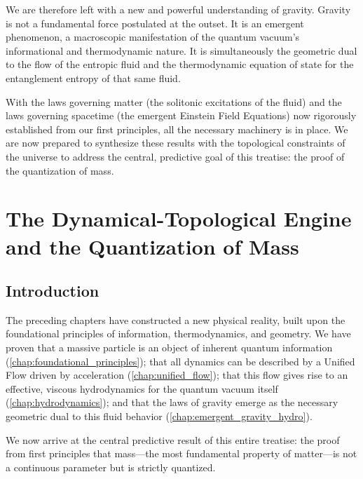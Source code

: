 \documentclass[11pt, letterpaper]{report}
\theoremstyle{plain} %
\theoremstyle{definition} %
\theoremstyle{remark} %
\begin{document}
We are therefore left with a new and powerful understanding of gravity. Gravity is not a fundamental force postulated at the outset. It is an emergent phenomenon, a macroscopic manifestation of the quantum vacuum's informational and thermodynamic nature. It is simultaneously the geometric dual to the flow of the entropic fluid and the thermodynamic equation of state for the entanglement entropy of that same fluid.

With the laws governing matter (the solitonic excitations of the fluid) and the laws governing spacetime (the emergent Einstein Field Equations) now rigorously established from our first principles, all the necessary machinery is in place. We are now prepared to synthesize these results with the topological constraints of the universe to address the central, predictive goal of this treatise: the proof of the quantization of mass.








\chapter{The Dynamical-Topological Engine and the Quantization of Mass}
\label{chap:quantization_of_mass}

\section{Introduction}
\label{sec:quant_intro}

The preceding chapters have constructed a new physical reality, built upon the foundational principles of information, thermodynamics, and geometry. We have proven that a massive particle is an object of inherent quantum information (\cref{chap:foundational_principles}); that all dynamics can be described by a Unified Flow driven by acceleration (\cref{chap:unified_flow}); that this flow gives rise to an effective, viscous hydrodynamics for the quantum vacuum itself (\cref{chap:hydrodynamics}); and that the laws of gravity emerge as the necessary geometric dual to this fluid behavior (\cref{chap:emergent_gravity_hydro}).

We now arrive at the central predictive result of this entire treatise: the proof from first principles that mass—the most fundamental property of matter—is not a continuous parameter but is strictly quantized.
\end{document}
